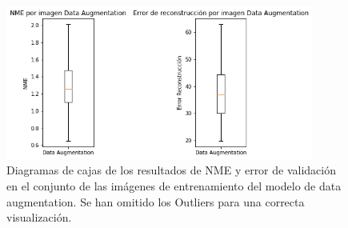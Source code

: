         \begin{figure}[h]
            \centering
            \includegraphics[width=0.9\textwidth]{img/boxplot_daug.png}
            \caption{Diagramas de cajas de los resultados de NME y error de validación en el conjunto de las imágenes de entrenamiento del modelo de data augmentation. Se han omitido los Outliers para una correcta visualización.}
            \label{fig:boxplot_ModeloDaug_NME}
        \end{figure}

